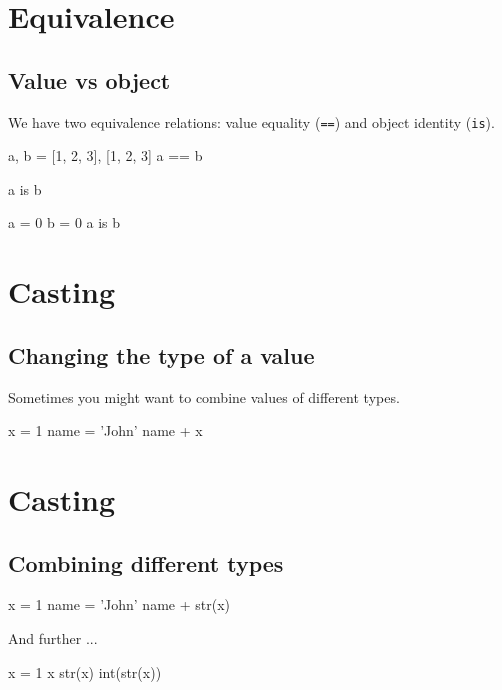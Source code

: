 \documentclass[aspectratio=1610,slidestop]{beamer}
\begin{document}
\section{Equivalence}
\subsection{Value vs object}
\begin{pframe}
We have two equivalence relations: value equality (\texttt{==}) and
object identity (\texttt{is}).
\begin{pyconsole}
a, b = [1, 2, 3], [1, 2, 3]
a == b

a is b

a = 0
b = 0
a is b

\end{pyconsole}
\end{pframe}


\section{Casting}
\subsection{Changing the type of a value}
\begin{pframe}
Sometimes you might want to combine values of different types.
\begin{pyconsole}
x = 1
name = 'John'
name + x
\end{pyconsole}
\end{pframe}


\section{Casting}
\subsection{Combining different types}
\begin{pframe}
\begin{pyconsole}
x = 1
name = 'John'
name + str(x)
\end{pyconsole}
\medskip
\medskip
And further ...
\begin{pyconsole}
x = 1
x
str(x)
int(str(x))
\end{pyconsole}
\end{pframe}
\end{document}
